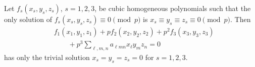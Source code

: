 \begin{proposition}
    Let $f_s(x_s,y_s,z_s)$, $s=1,2,3$, be cubic homogeneous polynomials such that the only solution of $f_s(x_s,y_s,z_s)\equiv0\pmod p$ is $x_s\equiv y_s\equiv z_s\equiv0\pmod p$. Then
\[
    \begin{aligned}&f_1(x_1,y_1,z_1)+pf_2(x_2,y_2,z_2)+p^2f_3(x_3,y_3,z_3)\\&\qquad{}+p^3\sum_{\ell,m,n}a_{\ell mn}x_\ell y_mz_n=0\end{aligned}
\]
    has only the trivial solution $x_s=y_s=z_s=0$ for $s=1,2,3$.
\end{proposition}
